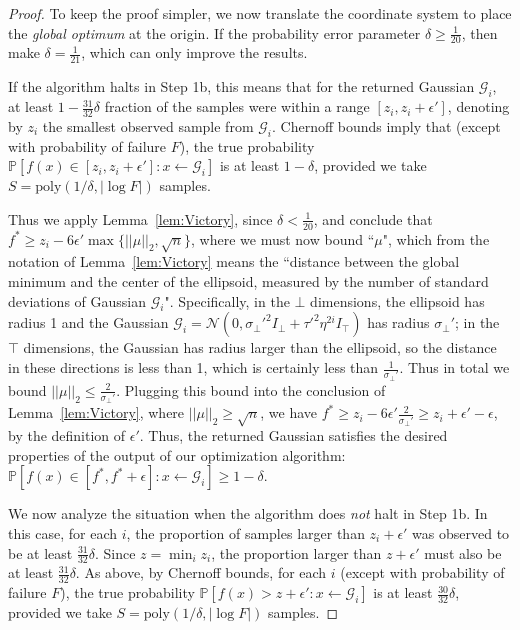 \documentclass[11pt,letter]{article}
\renewcommand{\Pr}{\mathbb{P}}
\newcommand{\from}{\leftarrow}
\renewcommand{\poly}{\mathrm{poly}}
\newcommand{\Normal}{\mathcal{N}}
\newcommand{\ferr}{\epsilon}
\newcommand{\perr}{\delta}
\numberwithin{nTheorems}{section}
\begin{document}
\begin{proof}
To keep the proof simpler, we now translate the coordinate system to place the \emph{global optimum} at the origin. If the probability error parameter $\perr\ge\frac{1}{20}$, then make $\perr=\frac{1}{21}$, which can only improve the results.



If the algorithm halts in Step 1b, this means that for the returned Gaussian $\mathcal{G}_i$,  at least $1-\frac{31}{32}\perr$ fraction of the samples were within a range $[z_i,z_i+\ferr']$, denoting by $z_i$ the smallest observed sample from $\mathcal{G}_i$. Chernoff bounds imply that (except with probability of failure $F$), the true probability $\Pr[f(x)\in[z_i,z_i+\ferr']:x\from\mathcal{G}_i]$ is at least $1-\perr$, provided we take $S=\poly(1/\delta,|\log F|)$ samples.

Thus we apply Lemma~\ref{lem:Victory}, since $\delta<\frac{1}{20}$, and conclude that $f^\ast\geq z_i-6\epsilon'\max\{||\mu||_2,\sqrt{n}\}$, where we must now bound ``$\mu$", which from the notation of Lemma~\ref{lem:Victory} means the ``distance between the global minimum and the center of the ellipsoid, measured by the number of standard deviations of Gaussian $\mathcal{G}_i$". Specifically, in the $\bot$ dimensions, the ellipsoid has radius 1 and the Gaussian $\mathcal{G}_i=\Normal(0, \sigma_\bot'^2 I_\bot + \tau'^2\eta^{2i} I_\top)$ has radius $\sigma_\bot'$; in the $\top$ dimensions, the Gaussian has radius larger than the ellipsoid, so the distance in these directions is less than 1, which is certainly less than $\frac{1}{\sigma_\bot'}$. Thus in total we bound $||\mu||_2\leq \frac{2}{\sigma_\bot'}$. Plugging this bound into the conclusion of Lemma~\ref{lem:Victory}, where $||\mu||_2\geq\sqrt{n}$, we have $f^\ast\geq z_i-6\epsilon'\frac{2}{\sigma_\bot'}\geq z_i+\ferr'-\ferr$, by the definition of $\ferr'$. Thus, the returned Gaussian satisfies the desired properties of the output of our optimization algorithm: $\Pr[f(x) \in [f^\ast, f^\ast+\ferr] : x \from \mathcal{G}_i] \ge 1-\delta$.

We now analyze the situation when the algorithm does \emph{not} halt in Step 1b. In this case, for each $i$, the proportion of samples larger than $z_i+\ferr'$ was observed to be at least $\frac{31}{32}\perr$. Since $z=\min_i z_i$, the proportion larger than $z+\ferr'$ must also be at least $\frac{31}{32}\perr$. As above, by Chernoff bounds, for each $i$ (except with probability of failure $F$), the true probability $\Pr[f(x)>z+\ferr':x\from\mathcal{G}_i]$ is at least $\frac{30}{32}\perr$, provided we take $S=\poly(1/\delta,|\log F|)$ samples.


\end{proof}
\end{document}
